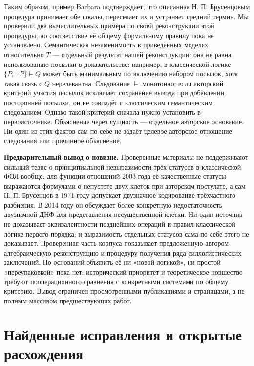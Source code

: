 \documentclass[12pt,a4paper]{article}
\begin{document}
Таким образом, пример Barbara подтверждает, что описанная Н. П. Брусенцовым процедура принимает обе шкалы, пересекает их и устраняет средний термин. Мы проверили два вычислительных примера по своей реконструкции этой процедуры, но соответствие её общему формальному правилу пока не установлено. Семантическая незаменимость в приведённых моделях относительно \(T\) — отдельный результат нашей реконструкции; она не равна использованию посылки в доказательстве: например, в классической логике \(\{P,\neg P\}\models Q\) может быть минимальным по включению набором посылок, хотя такая связь с \(Q\) нерелевантна. Следование \(\models\) монотонно; если авторский критерий участия посылок исключает сохранение вывода при добавлении посторонней посылки, он не совпадёт с классическим семантическим следованием. Однако такой критерий сначала нужно установить в первоисточнике. Объяснение через сущность — отдельное авторское основание. Ни один из этих фактов сам по себе не задаёт целевое авторское отношение следования или причинное объяснение.

\textbf{Предварительный вывод о новизне.} Проверенные материалы не поддерживают сильный тезис о принципиальной невыразимости трёх статусов в классической ФОЛ вообще: для функции отношений 2003 года её качественные статусы выражаются формулами о непустоте двух клеток при авторском постулате, а сам Н. П. Брусенцов в 1971 году допускает двузначное кодирование трёхчастного разбиения. В 2014 году он обсуждает более конкретную недостаточность двузначной ДНФ для представления несущественной клетки. Ни один источник не доказывает эквивалентности позднейших операций и правил классической логике первого порядка; и выразимость отдельных статусов сама по себе этого не доказывает. Проверенная часть корпуса показывает предложенную автором алгебраическую реконструкцию и процедуру получения ряда силлогистических заключений. Но оснований объявить её ни «новой логикой», ни простой «переупаковкой» пока нет: исторический приоритет и теоретическое новшество требуют пооперационного сравнения с конкретными системами по общему критерию. Вывод ограничен просмотренными публикациями и страницами, а не полным массивом предшествующих работ.

\section{Найденные исправления и открытые расхождения}
\end{document}
